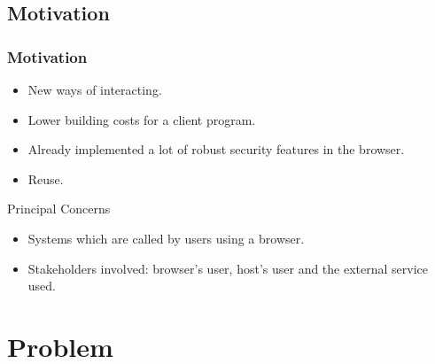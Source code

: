 \documentclass[serif,9pt]{beamer}
\begin{document}

\subsection{Motivation}
\begin{frame}
	\frametitle{Motivation}
	\begin{itemize}
		\item<1-> New ways of interacting.
		\item<1-> Lower building costs for a client program.
		\item<2-> Already implemented a lot of robust security features in the browser.
		\item<2-> Reuse.
	\end{itemize}
	
	\begin{block}{Principal Concerns}
	\begin{itemize}
		\item<3-> Systems which are called by users using a browser.
		\item<4> Stakeholders involved: browser's user, host's user and the external service used.
	\end{itemize}
	\end{block}
\end{frame}

\section{Problem}
\end{document}
